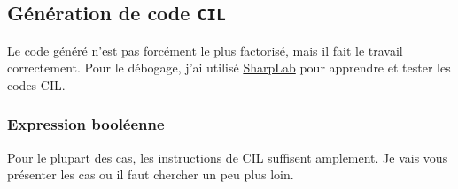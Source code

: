 \documentclass[11pt]{article}
\begin{document}
    \hypertarget{guxe9nuxe9ration-de-code-cil}{%
\subsection{\texorpdfstring{Génération de code
\texttt{CIL}}{Génération de code CIL}}\label{guxe9nuxe9ration-de-code-cil}}

Le code généré n'est pas forcément le plus factorisé, mais il fait le
travail correctement. Pour le débogage, j'ai utilisé
\href{https://sharplab.io/}{SharpLab} pour apprendre et tester les codes
CIL.

    \hypertarget{expression-booluxe9enne}{%
\subsubsection{Expression booléenne}\label{expression-booluxe9enne}}

Pour le plupart des cas, les instructions de CIL suffisent amplement. Je
vais vous présenter les cas ou il faut chercher un peu plus loin.
\end{document}
